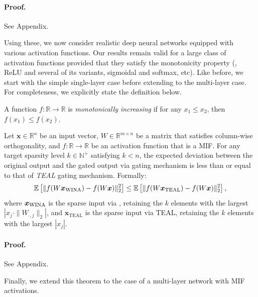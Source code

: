 {	\paragraph{Proof.} See Appendix.
	
	Using these, we now consider realistic deep neural networks equipped with various activation functions. Our results remain valid for a large class of activation functions provided that they satisfy the monotonicity property (\eg, ReLU and several of its variants, sigmoidal and softmax, etc). Like before, we start with the simple single-layer case before extending to the multi-layer case. For completeness, we explicitly state the definition below.
	\begin{definition}
		A function $f: \mathbb{R} \to \mathbb{R}$ is \emph{monotonically increasing} if for any $x_1 \leq x_2$, then $f(x_1) \leq f(x_2)$.
	\end{definition}
	
	\begin{lemma}\label{lemma:single_layer_act_function} 
		Let $\bm{x} \in \mathbb{R}^{n}$ be an input vector, $W \in \mathbb{R}^{m \times n}$ be a matrix that satisfies column-wise orthogonality, and $f: \mathbb{R} \to \mathbb{R}$ be an activation function that is a MIF. For any target sparsity level $k \in \mathbb{N}^+$ satisfying $k < n$, the expected deviation between the original output and the gated output via \textit{\algacro{}} gating mechanism is less than or equal to that of \textit{TEAL} gating mechanism. Formally: 
		$$\mathbb{E}\left[ \| f(W\bm{x}_\text{\algacro{}}) - f(W\bm{x}) \|_2^2 \right] \le \mathbb{E}\left[ \| f(W\bm{x}_\text{TEAL}) - f(W\bm{x}) \|_2^2 \right],$$ 
		where $\bm{x}_\text{\algacro{}}$ is the sparse input via \algacro{}, retaining the $k$ elements with the largest $|x_j \cdot \|W_{\cdot,j}\|_2 |$, and $\bm{x}_\text{TEAL}$ is the sparse input via TEAL, retaining the $k$ elements with the largest $|x_j|$.
	\end{lemma}
	
	\paragraph{Proof.} See Appendix.
	
	Finally, we extend this theorem to the case of a multi-layer network with MIF activations. 
	
}
